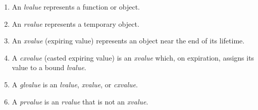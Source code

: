 \begin{enumerate}
  \item An \textit{lvalue} represents a function or object.
  \item An \textit{rvalue} represents a temporary object.
  \item An \textit{xvalue} (expiring value) represents an object near the end
  of its lifetime.
  \item A \textit{cxvalue} (casted expiring value) is an \textit{xvalue}
  which, on expiration, assigns its value to a bound \textit{lvalue}.
  \item A \textit{glvalue} is an \textit{lvalue}, \textit{xvalue}, or
  \textit{cxvalue}.
  \item A \textit{prvalue} is an \textit{rvalue} that is not an \textit{xvalue}.
\end{enumerate}


